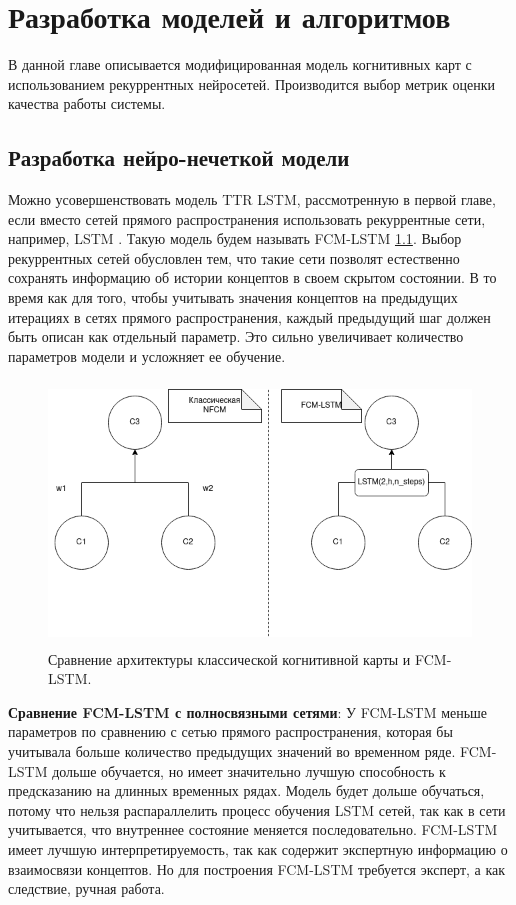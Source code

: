 \chapter{Разработка моделей и алгоритмов}

\begin{annotation}
	В данной главе описывается модифицированная модель
	когнитивных карт с использованием рекуррентных нейросетей.
	Производится выбор метрик оценки качества работы системы.
\end{annotation}

\section{Разработка нейро-нечеткой модели}

Можно усовершенствовать модель TTR LSTM, рассмотренную в первой главе,
если вместо сетей прямого распространения использовать рекуррентные сети,
например, LSTM \cite{LSTM_paper}. Такую модель будем называть FCM-LSTM \ref{img:nfcm_compare_with_classif_fcm}.
Выбор рекуррентных сетей обусловлен тем, что такие сети позволят естественно сохранять информацию об
истории концептов в своем скрытом состоянии. В то время как для
того, чтобы учитывать значения концептов на предыдущих итерациях
в сетях прямого распространения, каждый предыдущий шаг должен быть
описан как отдельный параметр. Это сильно увеличивает количество параметров
модели и усложняет ее обучение.

\def\figurename{Рис}
\begin{figure}[t]
	\centering
	\includegraphics[height=7cm]{./img/fcm_lstm_scheme.png}
	\caption{Сравнение архитектуры классической когнитивной карты и FCM-LSTM. }
	\label{img:nfcm_compare_with_classif_fcm}
\end{figure}

\textbf{Сравнение FCM-LSTM с полносвязными сетями}:
У FCM-LSTM меньше параметров по сравнению с сетью прямого распространения,
которая бы учитывала больше количество предыдущих значений во временном ряде.
FCM-LSTM дольше обучается, но имеет значительно лучшую способность к предсказанию
на длинных временных рядах.
Модель будет дольше обучаться, потому что нельзя распараллелить
процесс обучения LSTM сетей, так как в сети учитывается, что внутреннее состояние меняется последовательно.
FCM-LSTM имеет лучшую интерпретируемость, так как содержит
экспертную информацию о взаимосвязи концептов.
Но для построения FCM-LSTM требуется эксперт, а как следствие,
ручная работа.

